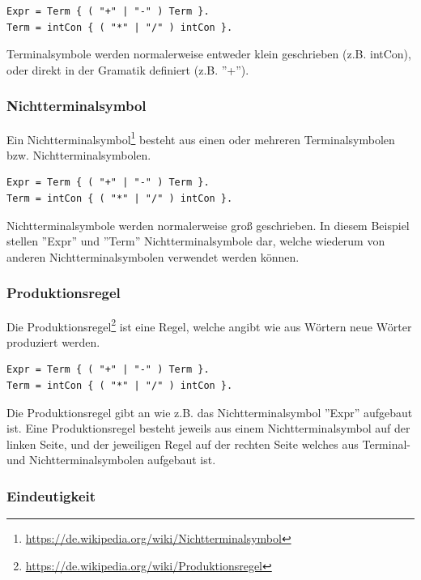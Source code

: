 \begin{lstlisting}[language=EBNF]
Expr = Term { ( "+" | "-" ) Term }.
Term = intCon { ( "*" | "/" ) intCon }.
\end{lstlisting}

Terminalsymbole werden normalerweise entweder klein geschrieben (z.B. intCon), oder direkt in der Gramatik definiert (z.B. ''+'').

\subsubsection{Nichtterminalsymbol}

Ein Nichtterminalsymbol\footnote{\url{https://de.wikipedia.org/wiki/Nichtterminalsymbol}} besteht aus einen oder mehreren Terminalsymbolen bzw. Nichtterminalsymbolen.

\begin{lstlisting}[language=EBNF]
Expr = Term { ( "+" | "-" ) Term }.
Term = intCon { ( "*" | "/" ) intCon }.
\end{lstlisting}

Nichtterminalsymbole werden normalerweise gro\ss{} geschrieben. In diesem Beispiel stellen ''Expr'' und ''Term'' Nichtterminalsymbole dar, welche wiederum von anderen Nichtterminalsymbolen verwendet werden k\"onnen.

\subsubsection{Produktionsregel}

Die Produktionsregel\footnote{\url{https://de.wikipedia.org/wiki/Produktionsregel}} ist eine Regel, welche angibt wie aus W\"ortern neue W\"orter produziert werden.

\begin{lstlisting}[language=EBNF]
Expr = Term { ( "+" | "-" ) Term }.
Term = intCon { ( "*" | "/" ) intCon }.
\end{lstlisting}

Die Produktionsregel gibt an wie z.B. das Nichtterminalsymbol ''Expr'' aufgebaut ist. Eine Produktionsregel besteht jeweils aus einem Nichtterminalsymbol auf der linken Seite, und der jeweiligen Regel auf der rechten Seite welches aus Terminal- und Nichtterminalsymbolen aufgebaut ist.

\newpage

\subsubsection{Eindeutigkeit}

